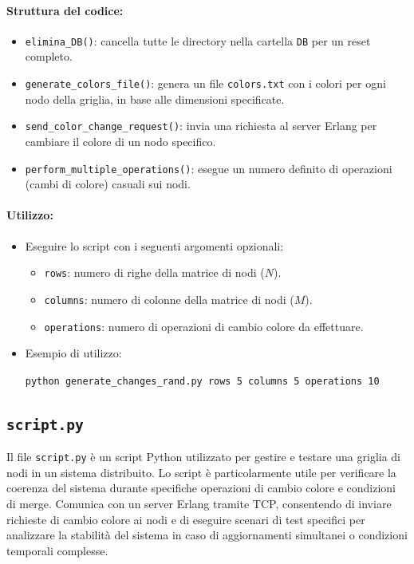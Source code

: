 \documentclass[12pt, a4paper]{report}
\begin{document}
\paragraph{Struttura del codice:}
\begin{itemize}
    \item \texttt{elimina\_DB()}: cancella tutte le directory nella cartella \texttt{DB} per un reset completo.
    \item \texttt{generate\_colors\_file()}: genera un file \texttt{colors.txt} con i colori per ogni nodo della griglia, in base alle dimensioni specificate.
    \item \texttt{send\_color\_change\_request()}: invia una richiesta al server Erlang per cambiare il colore di un nodo specifico.
    \item \texttt{perform\_multiple\_operations()}: esegue un numero definito di operazioni (cambi di colore) casuali sui nodi.
\end{itemize}

\paragraph{Utilizzo:}
\begin{itemize}
    \item Eseguire lo script con i seguenti argomenti opzionali:
        \begin{itemize}
            \item \texttt{rows}: numero di righe della matrice di nodi ($N$).
            \item \texttt{columns}: numero di colonne della matrice di nodi ($M$).
            \item \texttt{operations}: numero di operazioni di cambio colore da effettuare.
        \end{itemize}
    \item Esempio di utilizzo:
      
      \hspace{20pt}\texttt{python generate\_changes\_rand.py \-\-rows 5 \-\-columns 5 \-\-operations 10}
\end{itemize}

\subsection{\texttt{script.py}}\label{sec:script}

Il file \texttt{script.py} \`e un script Python utilizzato per gestire e testare una griglia di nodi in un sistema distribuito. Lo script \`e particolarmente utile per verificare la coerenza del sistema durante specifiche operazioni di cambio colore e condizioni di merge. Comunica con un server Erlang tramite TCP, consentendo di inviare richieste di cambio colore ai nodi e di eseguire scenari di test specifici per analizzare la stabilità del sistema in caso di aggiornamenti simultanei o condizioni temporali complesse.
\end{document}
